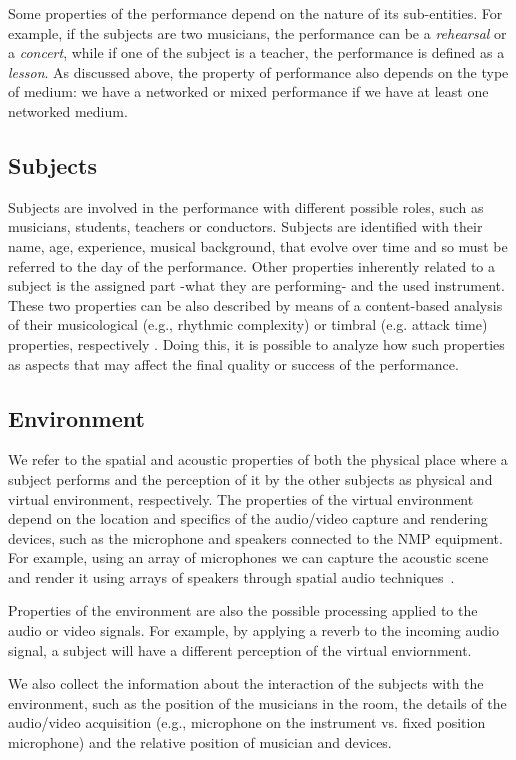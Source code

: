 Some properties of the performance depend on the nature of its sub-entities. For example, if the subjects are two musicians, the performance can be a \textit{rehearsal} or a \textit{concert}, while if one of the subject is a teacher, the performance is defined as a \textit{lesson}. As discussed above, the property of performance also depends on the type of medium: we have a networked or mixed performance if we have at least one networked medium.   

\subsection{Subjects}
Subjects are involved in the performance with different possible roles, such as musicians, students, teachers or conductors. Subjects are identified with their name, age, experience, musical background, that evolve over time and so must be referred to the day of the performance. Other properties inherently related to a subject is the assigned part -what they are performing- and the used instrument. These two properties can be also described by means of a content-based analysis of their musicological (e.g., rhythmic complexity) or timbral (e.g. attack time) properties, respectively \cite{RottondiFeature}.
Doing this, it is possible to analyze how such properties as aspects that may affect the final quality or success of the performance.


\subsection{Environment}
We refer to the spatial and acoustic properties of both the physical place where a subject performs and the perception of it by the other subjects as physical and virtual environment, respectively. The properties of the virtual environment depend on the location and specifics of the audio/video capture and rendering devices, such as the microphone and speakers connected to the NMP equipment. For example, using an array of microphones we can capture the acoustic scene~\cite{Markovic2013} and render it using arrays of speakers through spatial audio techniques~\cite{bianchi2016}.

Properties of the environment are also the possible processing applied to the audio or video signals. For example, by applying a reverb to the incoming audio signal, a subject will have a different perception of the virtual enviornment.

We also collect the information about the interaction of the subjects with the environment, such as the position of the musicians in the room, the details of the audio/video acquisition (e.g., microphone on the instrument vs. fixed position microphone) and the relative position of musician and devices. 

